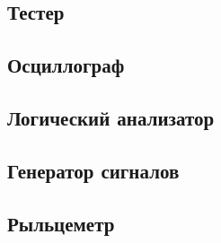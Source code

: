 \subsection{Тестер}

\subsection{Осциллограф}

\subsection{Логический анализатор}

\subsection{Генератор сигналов}

\subsection{Рыльцеметр}


